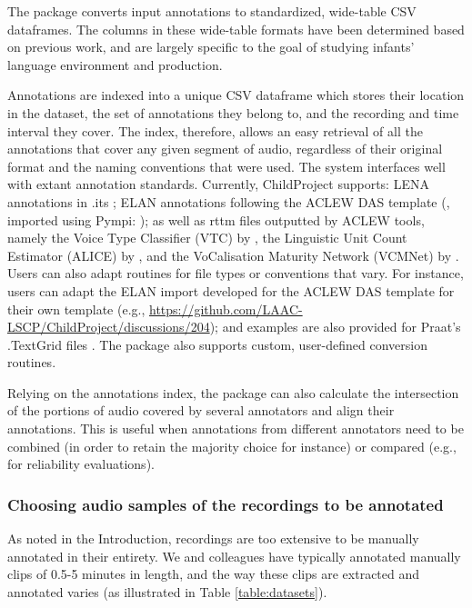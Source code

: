 \documentclass[smallextended]{svjour3}       %
\begin{document}
The package converts input annotations to standardized, wide-table CSV dataframes. The columns in these wide-table formats have been determined based on previous work, and are largely specific to the goal of studying infants' language environment and production.

Annotations are indexed into a unique CSV dataframe which stores their location in the dataset, the set of annotations they belong to, and the recording and time interval they cover. The index, therefore, allows an easy retrieval of all the annotations that cover any given segment of audio, regardless of their original format and the naming conventions that were used. The system interfaces well with extant annotation standards. Currently, ChildProject supports: LENA annotations in .its \citep{xu2008lenatm}; ELAN annotations following the ACLEW DAS template  (\citealt{Casillas2017}, imported using Pympi: \citealt{pympi-1.70}); as well as rttm files outputted by ACLEW tools, namely the Voice Type Classifier (VTC) by \citet{lavechin2020opensource}, the Linguistic Unit Count Estimator (ALICE) by \citet{rasanen2020}, and the VoCalisation Maturity Network (VCMNet) by \citet{AlFutaisi2019}. Users can also adapt routines for file types or conventions that vary. For instance, users can adapt the ELAN import developed for the ACLEW DAS template for their own template (e.g., \url{https://github.com/LAAC-LSCP/ChildProject/discussions/204}); and examples are also provided for Praat's .TextGrid files \citep{boersma2006praat}. The package also supports custom, user-defined conversion routines.

Relying on the annotations index, the package can also calculate the intersection of the portions of audio covered by several annotators and align their annotations. This is useful when annotations from different annotators need to be combined (in order to retain the majority choice for instance) or compared (e.g., for reliability evaluations).

\subsubsection*{Choosing audio samples of the recordings to be annotated}\label{section:choosing}

As noted in the Introduction, recordings are too extensive to be manually annotated in their entirety. We and colleagues have typically annotated manually clips of 0.5-5 minutes in length, and the way these clips are extracted and annotated varies (as illustrated in Table \ref{table:datasets}).
\end{document}
